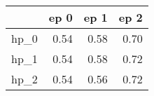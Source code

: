 \begin{tabular}{lrrr}
\toprule
{} &  ep 0 &  ep 1 &  ep 2 \\
\midrule
hp\_0 &  0.54 &  0.58 &  0.70 \\
hp\_1 &  0.54 &  0.58 &  0.72 \\
hp\_2 &  0.54 &  0.56 &  0.72 \\
\bottomrule
\end{tabular}
